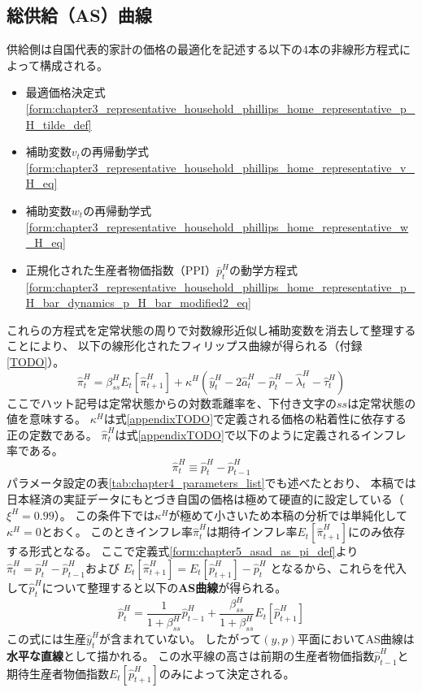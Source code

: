 
\subsection{総供給（AS）曲線}
\label{sec:chapter5_asad_as}
供給側は自国代表的家計の価格の最適化を記述する以下の4本の非線形方程式によって構成される。
\begin{itemize}
    \item 最適価格決定式\eqref{form:chapter3_representative_household_phillips_home_representative_p_H_tilde_def}
    \item 補助変数\(v_t\)の再帰動学式\eqref{form:chapter3_representative_household_phillips_home_representative_v_H_eq}
    \item 補助変数\(w_t\)の再帰動学式\eqref{form:chapter3_representative_household_phillips_home_representative_w_H_eq}
    \item 正規化された生産者物価指数（PPI）\(\bar{p}_t^H\)の動学方程式\eqref{form:chapter3_representative_household_phillips_home_representative_p_H_bar_dynamics_p_H_bar_modified2_eq}
\end{itemize}
これらの方程式を定常状態の周りで対数線形近似し補助変数を消去して整理することにより、
以下の線形化されたフィリップス曲線が得られる（付録\ref{TODO}）。
\begin{equation}
\label{form:chapter5_asad_as_pi_H_eq}
\hat{\pi}_t^H=\beta_{ss}^HE_t[\hat{\pi}_{t+1}^H]+\kappa^H(\hat{y}_t^H-2\hat{a}_t^H-\hat{p}_t^H-\hat{\lambda}_t^H-\hat{\tau}_t^H)
\end{equation}
ここでハット記号\(\hat{}\)は定常状態からの対数乖離率を、下付き文字の\(ss\)は定常状態の値を意味する。
\(\kappa^H\)は式\eqref{appendixTODO}で定義される価格の粘着性に依存する正の定数である。
\(\hat{\pi}_t^H\)は式\eqref{appendixTODO}で以下のように定義されるインフレ率である。
\begin{equation}
\label{form:chapter5_asad_as_pi_H_def}
    \hat{\pi}_t^H\equiv\hat{p}_t^H-\hat{p}_{t-1}^H
\end{equation}
パラメータ設定の表\ref{tab:chapter4_parameters_list}でも述べたとおり、
本稿では日本経済の実証データにもとづき自国の価格は極めて硬直的に設定している（\(\xi^H=0.99\)）。
この条件下では\(\kappa^H\)が極めて小さいため本稿の分析では単純化して\(\kappa^H=0\)とおく。
このときインフレ率\(\hat{\pi}_t^H\)は期待インフレ率\(E_t[\hat{\pi}_{t+1}^H]\)にのみ依存する形式となる。
ここで定義式\eqref{form:chapter5_asad_as_pi_def}より
\(\hat{\pi}_t^H=\hat{p}_t^H-\hat{p}_{t-1}^H\)および
\(E_t[\hat{\pi}_{t+1}^H]=E_t[\hat{p}_{t+1}^H]-\hat{p}_t^H\)
となるから、これらを代入して\(\hat{p}_t^H\)について整理すると以下の\textbf{AS曲線}が得られる。
\begin{equation}
\label{form:chapter5_asad_as_p_H_eq}
\hat{p}_t^H=\frac{1}{1+\beta_{ss}^H}\hat{p}_{t-1}^H+\frac{\beta_{ss}^H}{1+\beta_{ss}^H}E_t[\hat{p}_{t+1}^H]
\end{equation}
この式には生産\(\hat{y}_t^H\)が含まれていない。
したがって\((y,p)\)平面においてAS曲線は\textbf{水平な直線}として描かれる。
この水平線の高さは前期の生産者物価指数\(\hat{p}_{t-1}^H\)と
期待生産者物価指数\(E_t[\hat{p}_{t+1}^H]\)のみによって決定される。